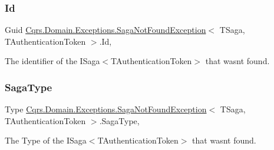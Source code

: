 \subsubsection{\texorpdfstring{Id}{Id}}
{\footnotesize\ttfamily Guid \hyperlink{classCqrs_1_1Domain_1_1Exceptions_1_1SagaNotFoundException}{Cqrs.\+Domain.\+Exceptions.\+Saga\+Not\+Found\+Exception}$<$ T\+Saga, T\+Authentication\+Token $>$.Id\hspace{0.3cm}{\ttfamily [get]}, {\ttfamily [set]}}



The identifier of the I\+Saga$<$\+T\+Authentication\+Token$>$ that wasn\textquotesingle{}t found. 

\mbox{\label{classCqrs_1_1Domain_1_1Exceptions_1_1SagaNotFoundException_aec80a2d55dc17dd78eec5c7b77a67b2f_aec80a2d55dc17dd78eec5c7b77a67b2f}} 
\subsubsection{\texorpdfstring{Saga\+Type}{SagaType}}
{\footnotesize\ttfamily Type \hyperlink{classCqrs_1_1Domain_1_1Exceptions_1_1SagaNotFoundException}{Cqrs.\+Domain.\+Exceptions.\+Saga\+Not\+Found\+Exception}$<$ T\+Saga, T\+Authentication\+Token $>$.Saga\+Type\hspace{0.3cm}{\ttfamily [get]}, {\ttfamily [set]}}



The Type of the I\+Saga$<$\+T\+Authentication\+Token$>$ that wasn\textquotesingle{}t found. 

